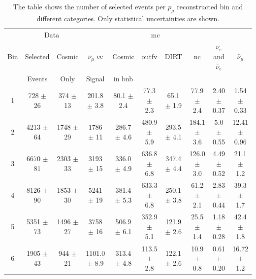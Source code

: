 \begin{table}[]
\scriptsize
\begin{adjustwidth}{-1.5cm}{-1cm}
\caption[Selected Events Per $p_\mu$ Bin]{The table shows the number of selected events per $p_\mu$ reconstructed bin and different categories. Only statistical uncertainties  are shown.}
\label{tab:pmu_events}
\centering
\begin{tabular}{c|cc|ccccccc}
\toprule
    & \multicolumn{2}{c}{Data}    & \multicolumn{6}{c}{\acrshort{mc}} \\
Bin & Selected & Cosmic & $\nu_\mu$ \acrshort{cc} & Cosmic  & \acrshort{outfv} & DIRT & \acrshort{nc} & $\nu_e$ and $\bar{\nu}_e$ & $\bar{\nu}_\mu$ \\
    & Events   & Only   & Signal       & in \acrshort{bnb}  &       &      &    &                           &                 \\
\midrule
1 & 728 $\pm$ 26 & 374 $\pm$ 13 & 201.8 $\pm$ 3.8 & 80.1 $\pm$ 2.4 & 77.3 $\pm$ 2.3    & 65.1 $\pm$ 1.9 & 77.9 $\pm$ 2.4    & 2.40 $\pm$ 0.37 & 1.54 $\pm$ 0.33 \\ 
2 & 4213 $\pm$ 64 & 1748 $\pm$ 29 & 1786 $\pm$ 11 & 286.7 $\pm$ 4.6 & 480.9 $\pm$ 5.9  & 293.5 $\pm$ 4.1 & 184.1 $\pm$ 3.6 & 5.0 $\pm$ 0.55 & 12.41 $\pm$ 0.96 \\ 
3 & 6670 $\pm$ 81 & 2303 $\pm$ 33 & 3193 $\pm$ 15 & 336.0 $\pm$ 4.9 & 636.8 $\pm$ 6.8  & 347.4 $\pm$ 4.4 & 126.0 $\pm$ 3.0 & 4.49 $\pm$ 0.52 & 21.1 $\pm$ 1.2 \\ 
4 & 8126 $\pm$ 90 & 1853 $\pm$ 30 & 5241 $\pm$ 19 & 381.4 $\pm$ 5.3 & 633.3 $\pm$ 6.8  & 250.1 $\pm$ 3.8 & 61.2 $\pm$ 2.1  & 2.83 $\pm$ 0.44 & 39.3 $\pm$ 1.7 \\ 
5 & 5351 $\pm$ 73 & 1496 $\pm$ 27 & 3758 $\pm$ 16 & 506.9 $\pm$ 6.1 & 352.9 $\pm$ 5.1  & 121.9 $\pm$ 2.6 & 25.5 $\pm$ 1.4  & 1.18 $\pm$ 0.28 & 42.4 $\pm$ 1.8 \\ 
6 & 1905 $\pm$ 43 & 944 $\pm$ 21 & 1101.0 $\pm$ 8.9 & 313.4 $\pm$ 4.8 & 113.5 $\pm$ 2.8  & 122.1 $\pm$ 2.6 & 10.9 $\pm$ 0.8 & 0.61 $\pm$ 0.20 & 16.72 $\pm$ 1.2 \\ 
\bottomrule
\end{tabular}
\end{adjustwidth}
\end{table}




